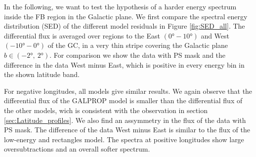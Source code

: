 In the following, we want to test the hypothesis of a harder energy spectrum inside the FB region in the Galactic plane. We first compare the spectral energy distribution (SED) of the different model residuals in Figure \ref{fig:SED_all}. The differential flux is averaged over regions to the East $(\ang{0} - \ang{10})$ and West $(\ang{-10} - \ang{0})$ of the GC, in a very thin stripe covering the Galactic plane $b \in (\ang{-2},\ \ang{2})$. For comparison we show the data with PS mask and the difference in the data West minus East, which is positive in every energy bin in the shown latitude band.

For negative longitudes, all models give similar results. We again observe that the differential flux of the GALPROP model is smaller than the differential flux of the other models, wich is consistent with the observation in section \ref{sec:Latitude_profiles}. We also find an assymmetry in the flux of the data with PS mask. The difference of the data West minus East is similar to the flux of the low-energy and rectangles model. The spectra at positive longitudes show large oversubtractions and an overall softer spectrum. 

